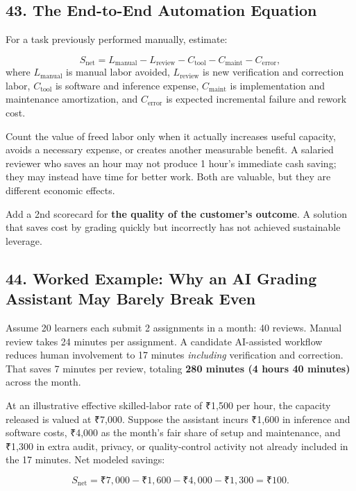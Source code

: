 \subsection*{43. The End-to-End Automation Equation}

For a task previously performed manually, estimate:

\begin{equation}
S_{\text{net}} = L_{\text{manual}} - L_{\text{review}} - C_{\text{tool}} - C_{\text{maint}} - C_{\text{error}},
\end{equation}
where $L_{\text{manual}}$ is manual labor avoided, $L_{\text{review}}$ is new verification and correction labor, $C_{\text{tool}}$ is software and inference expense, $C_{\text{maint}}$ is implementation and maintenance amortization, and $C_{\text{error}}$ is expected incremental failure and rework cost.

Count the value of freed labor only when it actually increases useful capacity, avoids a necessary expense, or creates another measurable benefit. A salaried reviewer who saves an hour may not produce 1 hour's immediate cash saving; they may instead have time for better work. Both are valuable, but they are different economic effects.

Add a 2nd scorecard for \textbf{the quality of the customer's outcome}. A solution that saves cost by grading quickly but incorrectly has not achieved sustainable leverage.

\subsection*{44. Worked Example: Why an AI Grading Assistant May Barely Break Even}

Assume 20 learners each submit 2 assignments in a month: 40 reviews. Manual review takes 24 minutes per assignment. A candidate AI-assisted workflow reduces human involvement to 17 minutes \emph{including} verification and correction. That saves 7 minutes per review, totaling \textbf{280 minutes (4 hours 40 minutes)} across the month.

At an illustrative effective skilled-labor rate of ₹1,500 per hour, the capacity released is valued at ₹7,000. Suppose the assistant incurs ₹1,600 in inference and software costs, ₹4,000 as the month's fair share of setup and maintenance, and ₹1,300 in extra audit, privacy, or quality-control activity not already included in the 17 minutes. Net modeled savings:

\begin{equation}
S_{\text{net}} = ₹7{,}000 - ₹1{,}600 - ₹4{,}000 - ₹1{,}300 = \text{₹}100.
\end{equation}

